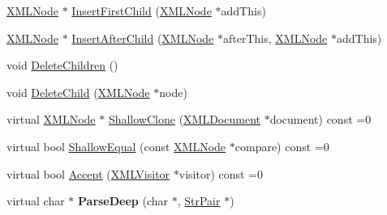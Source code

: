\begin{DoxyCompactItemize}
\item 
\hyperlink{classtinyxml2_1_1_x_m_l_node}{X\-M\-L\-Node} $\ast$ \hyperlink{classtinyxml2_1_1_x_m_l_node_ac609a8f3ea949027f439280c640bbaf2}{Insert\-First\-Child} (\hyperlink{classtinyxml2_1_1_x_m_l_node}{X\-M\-L\-Node} $\ast$add\-This)
\item 
\hyperlink{classtinyxml2_1_1_x_m_l_node}{X\-M\-L\-Node} $\ast$ \hyperlink{classtinyxml2_1_1_x_m_l_node_a9275138a1b8dd5d8e2c26789bdc23ac8}{Insert\-After\-Child} (\hyperlink{classtinyxml2_1_1_x_m_l_node}{X\-M\-L\-Node} $\ast$after\-This, \hyperlink{classtinyxml2_1_1_x_m_l_node}{X\-M\-L\-Node} $\ast$add\-This)
\item 
void \hyperlink{classtinyxml2_1_1_x_m_l_node_a0360085cc54df5bff85d5c5da13afdce}{Delete\-Children} ()
\item 
void \hyperlink{classtinyxml2_1_1_x_m_l_node_a363b6edbd6ebd55f8387d2b89f2b0921}{Delete\-Child} (\hyperlink{classtinyxml2_1_1_x_m_l_node}{X\-M\-L\-Node} $\ast$node)
\item 
virtual \hyperlink{classtinyxml2_1_1_x_m_l_node}{X\-M\-L\-Node} $\ast$ \hyperlink{classtinyxml2_1_1_x_m_l_node_a8402cbd3129d20e9e6024bbcc0531283}{Shallow\-Clone} (\hyperlink{classtinyxml2_1_1_x_m_l_document}{X\-M\-L\-Document} $\ast$document) const =0
\item 
virtual bool \hyperlink{classtinyxml2_1_1_x_m_l_node_a7ce18b751c3ea09eac292dca264f9226}{Shallow\-Equal} (const \hyperlink{classtinyxml2_1_1_x_m_l_node}{X\-M\-L\-Node} $\ast$compare) const =0
\item 
virtual bool \hyperlink{classtinyxml2_1_1_x_m_l_node_a81e66df0a44c67a7af17f3b77a152785}{Accept} (\hyperlink{classtinyxml2_1_1_x_m_l_visitor}{X\-M\-L\-Visitor} $\ast$visitor) const =0
\item 
\hypertarget{classtinyxml2_1_1_x_m_l_node_a7610d0f603e8b603d2078521811a23c1}{virtual char $\ast$ {\bfseries Parse\-Deep} (char $\ast$, \hyperlink{classtinyxml2_1_1_str_pair}{Str\-Pair} $\ast$)}\label{classtinyxml2_1_1_x_m_l_node_a7610d0f603e8b603d2078521811a23c1}

\end{DoxyCompactItemize}
